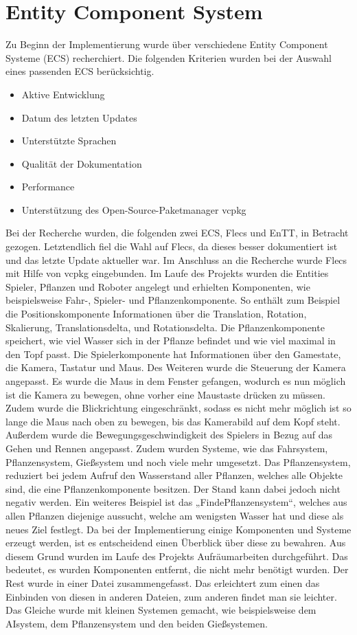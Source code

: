 
\section{Entity Component System}
Zu Beginn der Implementierung wurde über verschiedene Entity Component Systeme (ECS) recherchiert. Die folgenden Kriterien wurden bei der Auswahl eines passenden ECS berücksichtig. 
\begin{itemize}
	\item Aktive Entwicklung
	\item Datum des letzten Updates
	\item Unterstützte Sprachen
	\item Qualität der Dokumentation
	\item Performance
	\item Unterstützung des Open-Source-Paketmanager vcpkg
\end{itemize}
Bei der Recherche wurden, die folgenden zwei ECS, Flecs und EnTT, in Betracht gezogen. Letztendlich fiel die Wahl auf Flecs, da dieses besser dokumentiert ist und das letzte Update aktueller war. 
Im Anschluss an die Recherche wurde Flecs mit Hilfe von vcpkg eingebunden. Im Laufe des Projekts wurden die Entities Spieler, Pflanzen und Roboter angelegt und erhielten Komponenten, wie beispielsweise Fahr-, Spieler- und Pflanzenkomponente. So enthält zum Beispiel die Positionskomponente Informationen über die Translation, Rotation, Skalierung, Translationsdelta, und Rotationsdelta. Die Pflanzenkomponente speichert, wie viel Wasser sich in der Pflanze befindet und wie viel maximal in den Topf passt. Die Spielerkomponente hat Informationen über den Gamestate, die Kamera, Tastatur und Maus. Des Weiteren wurde die Steuerung der Kamera angepasst. Es wurde die Maus in dem Fenster gefangen, wodurch es nun möglich ist die Kamera zu bewegen, ohne vorher eine Maustaste drücken zu müssen. Zudem wurde die Blickrichtung eingeschränkt, sodass es nicht mehr möglich ist so lange die Maus nach oben zu bewegen, bis das Kamerabild auf dem Kopf steht. Außerdem wurde die Bewegungsgeschwindigkeit des Spielers in Bezug auf das Gehen und Rennen angepasst.
Zudem wurden Systeme, wie das Fahrsystem, Pflanzensystem, Gießsystem und noch viele mehr umgesetzt. Das Pflanzensystem, reduziert bei jedem Aufruf den Wasserstand aller Pflanzen, welches alle Objekte sind, die eine Pflanzenkomponente besitzen. Der Stand kann dabei jedoch nicht negativ werden. Ein weiteres Beispiel ist das „FindePflanzensystem“, welches aus allen Pflanzen diejenige aussucht, welche am wenigsten Wasser hat und diese als neues Ziel festlegt. 
Da bei der Implementierung einige Komponenten und Systeme erzeugt werden, ist es entscheidend einen Überblick über diese zu bewahren. Aus diesem Grund wurden im Laufe des Projekts Aufräumarbeiten durchgeführt. Das bedeutet, es wurden Komponenten entfernt, die nicht mehr benötigt wurden. Der Rest wurde in einer Datei zusammengefasst. Das erleichtert zum einen das Einbinden von diesen in anderen Dateien, zum anderen findet man sie leichter. Das Gleiche wurde mit kleinen Systemen gemacht, wie beispielsweise dem AIsystem, dem Pflanzensystem und den beiden Gießsystemen.  

